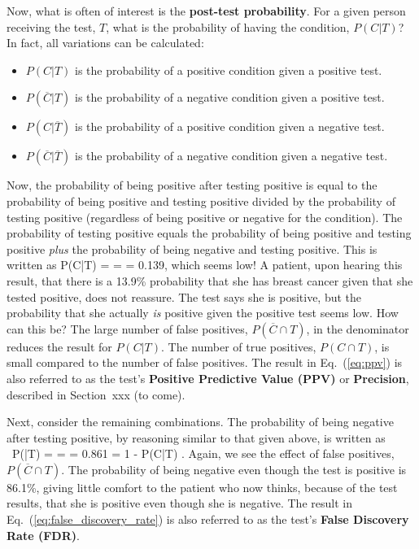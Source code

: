 Now, what is often of interest is the {\bf post-test probability}.  
For a given person
receiving the test, $T$, what is the probability of having the condition, $P(C|T)$?
In fact, all variations can be calculated:
\begin{itemize}
\item $P(C|T)$ is the probability of a positive condition given a positive test.
\item $P(\overline{C}|T)$ is the probability of a negative condition given a positive test.
\item $P(C|\overline{T})$ is the probability of a positive condition given a negative test.
\item $P(\overline{C}|\overline{T})$ is the probability of a negative condition given a negative test.
\end{itemize}

\vspace{1.5cm}

Now, the probability of being positive after testing positive is equal to the probability of
being positive and testing positive divided by the probability of testing positive
(regardless of being positive or negative for the condition).
The probability of testing positive equals the probability of being positive and 
testing positive {\em plus} 
the probability of being negative and testing positive.  This is
written as
\be
 P(C|T) = \dst{} = 
  = 
 0.139, 
 \label{eq:ppv} 
\ee
which seems low!  
A patient, upon hearing this result, 
that there is a 13.9\% probability that 
she has breast 
cancer given that she tested positive, does not reassure.  
The test says she is positive, but the probability that 
she actually {\em is} positive
given the positive test seems low.  How can this be?
The large number of false positives, 
$P(\overline{C} \cap T)$, in the denominator
reduces the result for $P(C|T)$. 
The number of true positives, $P(C \cap T)$, is small 
compared to the number of false
positives.  The result in Eq.~(\ref{eq:ppv}) is 
also referred to as the test's
{\bf Positive Predictive Value (PPV)} 
or {\bf Precision}, described in Section~xxx (to come).

Next, consider the remaining combinations.  
The probability of being negative after 
testing positive, by reasoning similar to that 
given above, is written as
\be
\ P(|T) = \dst{} = 
  = 
 0.861 = 1 - P(C|T) \mbox{}.
 \label{eq:false_discovery_rate}
\ee
Again, we see the effect of false positives, $P(\overline{C} \cap T)$.  
The probability of being negative even though
the test is positive is 86.1\%, giving little comfort to the patient who now thinks, 
because of the test results, that
she is positive even though she is negative. 
The result in Eq.~(\ref{eq:false_discovery_rate}) is also 
referred to as the 
test's {\bf False Discovery Rate (FDR)}.  

